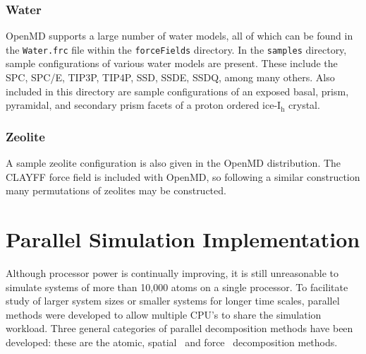 \documentclass[]{book}
\begin{document}
\subsection{Water}
{\sc OpenMD} supports a large number of water models, all of which can
be found in the {\tt Water.frc} file within the {\tt forceFields}
directory. In the {\tt samples} directory, sample configurations of
various water models are present. These include the SPC, SPC/E, TIP3P,
TIP4P, SSD, SSDE, SSDQ, among many others. Also included in this
directory are sample configurations of an exposed basal, prism,
pyramidal, and secondary prism facets of a proton ordered
ice-I$_\mathrm{h}$ crystal.

\subsection{Zeolite}
A sample zeolite configuration is also given in the {\sc OpenMD}
distribution. The CLAYFF force field is included with {\sc OpenMD}, so
following a similar construction many permutations of zeolites may be
constructed.


\chapter{\label{section:parallelization} Parallel Simulation Implementation}

Although processor power is continually improving, it is still
unreasonable to simulate systems of more than 10,000 atoms on a single
processor. To facilitate study of larger system sizes or smaller
systems for longer time scales, parallel methods were developed to
allow multiple CPU's to share the simulation workload. Three general
categories of parallel decomposition methods have been developed:
these are the atomic,\cite{Fox88} spatial~\cite{plimpton95} and
force~\cite{Paradyn} decomposition methods.
\end{document}
